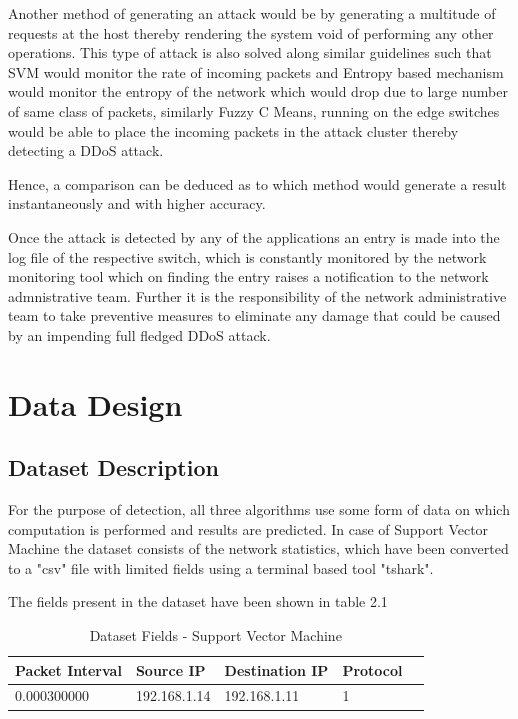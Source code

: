 \documentclass[12pt,a4paper,final]{report}
\begin{document}
Another method of generating an attack would be by generating a multitude of requests at the host thereby rendering the system void of performing any other operations. This type of attack is also solved along similar guidelines such that SVM would monitor the rate of incoming packets and Entropy based mechanism would monitor the entropy of the network which would drop due to large number of same class of packets, similarly Fuzzy C Means, running on the edge switches would be able to place the incoming packets in the attack cluster thereby detecting a DDoS attack.

Hence, a comparison can be deduced as to which method would generate a result instantaneously and with higher accuracy.

Once the attack is detected by any of the applications an entry is made into the log file of the respective switch, which is constantly monitored by the network monitoring tool which on finding the entry raises a notification to the network admnistrative team. Further it is the responsibility of the network administrative team to take preventive measures to eliminate any damage that could be caused by an impending full fledged DDoS attack.

\section{Data Design}
\subsection{Dataset Description}
For the purpose of detection, all three algorithms use some form of data on which computation is performed and results are predicted. In case of Support Vector Machine the dataset consists of the network statistics, which have been converted to a "csv" file with limited fields using a terminal based tool "tshark".
\newline

The fields present in the dataset have been shown in table 2.1
\begin{table}[h]
\begin{center}
\begin{tabular}{|p{3cm}|p{3cm}|p{4cm}|p{3.5cm}|p{4cm}|}
\hline 
\textbf{Packet Interval} & \textbf{Source IP} & \textbf{Destination IP} & \textbf{Protocol} \\ 
\hline 
0.000300000 & 192.168.1.14 & 192.168.1.11 & 1 \\ 
\hline
\end{tabular} 
\end{center}
\caption{Dataset Fields - Support Vector Machine}
\end{table}
\end{document}
